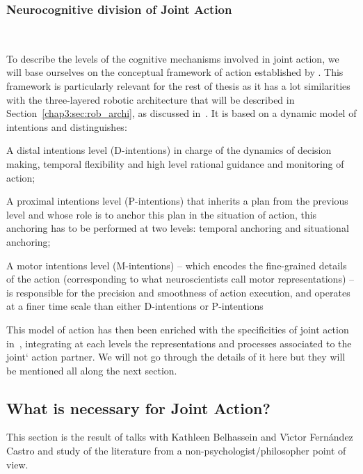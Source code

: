 \documentclass[a4paper,11pt,twoside]{StyleThese}
\begin{document}
\subsubsection{Neurocognitive division of Joint Action}~\label{chap1:subsubsec:neuro_seg}

To describe the levels of the cognitive mechanisms involved in joint action, we will base ourselves on the conceptual framework of action established by \cite{pacherie_2008_phenomenology}. This framework is particularly relevant for the rest of thesis as it has a lot similarities with the three-layered robotic architecture that will be described in Section~\ref{chap3:sec:rob_archi}, as discussed in~\citep{clodic_2017_key}. It is based on a dynamic model of intentions and distinguishes:

\begin{bulletList}
	\item A distal intentions level (D-intentions) in charge of the dynamics of decision making, temporal flexibility and high level rational guidance and monitoring of action;
	\item A proximal intentions level (P-intentions) that inherits a plan from the previous level and whose role is to anchor this plan in the situation of action, this anchoring has to be performed at two levels: temporal anchoring and situational anchoring;
	\item A motor intentions level (M-intentions) -- which encodes the fine-grained details of the action (corresponding to what neuroscientists call motor representations) -- is responsible for the precision and smoothness of action execution, and operates at a finer time scale than either D-intentions or P-intentions
\end{bulletList}

This model of action has then been enriched with the specificities of joint action in~\citep{pacherie_2012_agency}, integrating at each levels the representations and processes associated to the joint` action partner. We will not go through the details of it here but they will be mentioned all along the next section.

\subsection{What is necessary for Joint Action?}\label{chap1:subsec:necess_ja}

This section is the result of talks with Kathleen Belhassein and V{\'\i}ctor Fern{\'a}ndez Castro and study of the literature from a non-psychologist/philosopher point of view.
\end{document}
